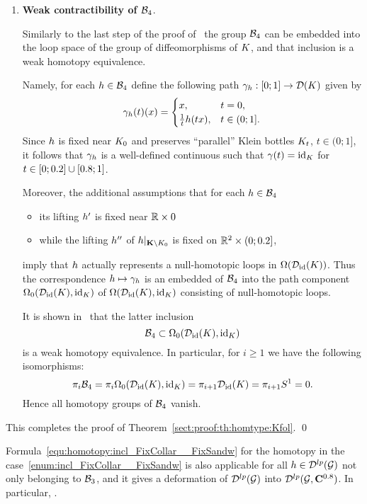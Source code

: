 \begin{enumerate}[wide, label={\rm\arabic*)}, topsep=1ex, itemsep=1ex]
\item
{\bf Weak contractibility of $\mathcal{B}_{ 4 }$}.

Similarly to the last step of the proof of~\cite[Theorem~1.1.1]{KhokhliukMaksymenko:lens:2022} the group $\mathcal{B}_{ 4 }$ can be embedded into the loop space of the group of diffeomorphisms of $K$, and that inclusion is a weak homotopy equivalence.

Namely, for each $h\in\mathcal{B}_{ 4 }$ define the following path $\gamma_{h}:[0;1]\to\mathcal{D}(K)$ given by
\[
\gamma_{h}(t)(x) =
\begin{cases}
x, & t=0, \\
\tfrac{1}{t}h(tx), & t\in(0;1].
\end{cases}
\]
Since $h$ is fixed near $K_{0}$ and preserves ``parallel'' Klein bottles $K_{t}$, $t\in(0;1]$, it follows that $\gamma_{h}$ is a well-defined continuous  such that $\gamma(t)=\mathrm{id}_{K}$ for $t\in[0;0.2]\cup[0.8;1]$.

Moreover, the additional assumptions that for each $h\in\mathcal{B}_{ 4 }$
\begin{itemize}[label={$- $}]
\item its lifting $h'$ is fixed near $\mathbb{R}\times0$
\item while the lifting $h''$ of $h|_{\mathbf{K}\setminus K_{0}}$ is fixed on $\mathbb{R}^2\times(0;0.2]$,
\end{itemize}
imply that $h$ actually represents a null-homotopic loops in $\Omega(\mathcal{D}_{\mathrm{id}}(K))$.
Thus the correspondence $h\mapsto\gamma_{h}$ is an embedded of $\mathcal{B}_{ 4 }$ into the path component $\Omega_0(\mathcal{D}_{\mathrm{id}}(K), \mathrm{id}_{K})$ of $\Omega(\mathcal{D}_{\mathrm{id}}(K), \mathrm{id}_{K})$ consisting of null-homotopic loops.

It is shown in~\cite[Corollary~1.10]{KhokhliukMaksymenko:PIGC:2020} that the latter inclusion 
\[ 
    \mathcal{B}_{ 4 } \subset \Omega_0(\mathcal{D}_{\mathrm{id}}(K), \mathrm{id}_{K})
\]
is a weak homotopy equivalence.
In particular, for $i\geq1$ we have the following isomorphisms:
\[
    \pi_i\mathcal{B}_{ 4 } = \pi_i\Omega_0(\mathcal{D}_{\mathrm{id}}(K), \mathrm{id}_{K}) = \pi_{i+1}\mathcal{D}_{\mathrm{id}}(K) = \pi_{i+1}S^1 = 0.
\]
Hence all homotopy groups of $\mathcal{B}_{ 4 }$ vanish.
\end{enumerate}
This completes the proof of Theorem~\ref{sect:proof:th:homtype:Kfol}.
\qed


\begin{remark}\label{rem:DlpC08:contractible}
Formula~\eqref{equ:homotopy:incl_FixCollar__FixSandw} for the homotopy in the case~\ref{enum:incl_FixCollar__FixSandw} is also applicable for all $h\in\mathcal{D}^{lp}(\mathcal{G})$ not only belonging to $\mathcal{B}_{ 3 }$, and it gives a deformation of $\mathcal{D}^{lp}(\mathcal{G})$ into $\mathcal{D}^{lp}(\mathcal{G},\mathbf{C}^{0.8})$.
In particular, .
\end{remark}


